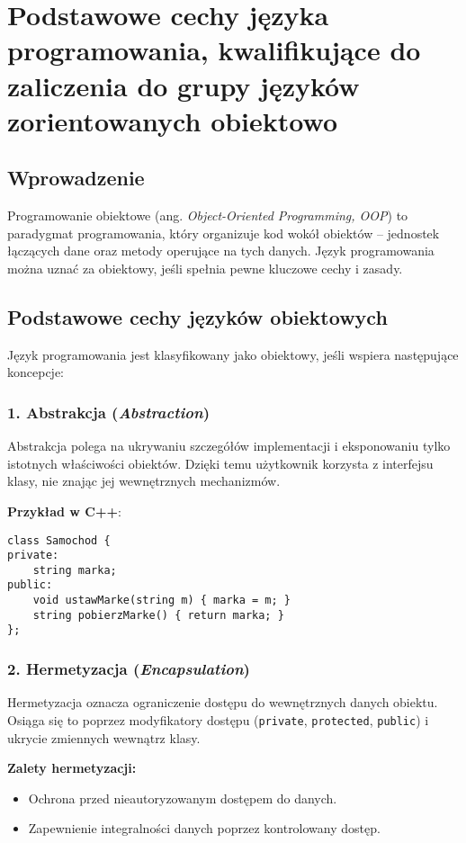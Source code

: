 \section{Podstawowe cechy języka programowania, kwalifikujące do zaliczenia do grupy języków zorientowanych obiektowo}

\subsection{Wprowadzenie}
Programowanie obiektowe (ang. \textit{Object-Oriented Programming, OOP}) to paradygmat programowania, który organizuje kod wokół obiektów – jednostek łączących dane oraz metody operujące na tych danych. Język programowania można uznać za obiektowy, jeśli spełnia pewne kluczowe cechy i zasady.

\subsection{Podstawowe cechy języków obiektowych}
Język programowania jest klasyfikowany jako obiektowy, jeśli wspiera następujące koncepcje:

\subsubsection{1. Abstrakcja (\textit{Abstraction})}
Abstrakcja polega na ukrywaniu szczegółów implementacji i eksponowaniu tylko istotnych właściwości obiektów. Dzięki temu użytkownik korzysta z interfejsu klasy, nie znając jej wewnętrznych mechanizmów.

\textbf{Przykład w C++}:
\begin{verbatim}
class Samochod {
private:
    string marka;
public:
    void ustawMarke(string m) { marka = m; }
    string pobierzMarke() { return marka; }
};
\end{verbatim}

\subsubsection{2. Hermetyzacja (\textit{Encapsulation})}
Hermetyzacja oznacza ograniczenie dostępu do wewnętrznych danych obiektu. Osiąga się to poprzez modyfikatory dostępu (\texttt{private}, \texttt{protected}, \texttt{public}) i ukrycie zmiennych wewnątrz klasy.

\textbf{Zalety hermetyzacji:}
\begin{itemize}
    \item Ochrona przed nieautoryzowanym dostępem do danych.
    \item Zapewnienie integralności danych poprzez kontrolowany dostęp.
\end{itemize}

